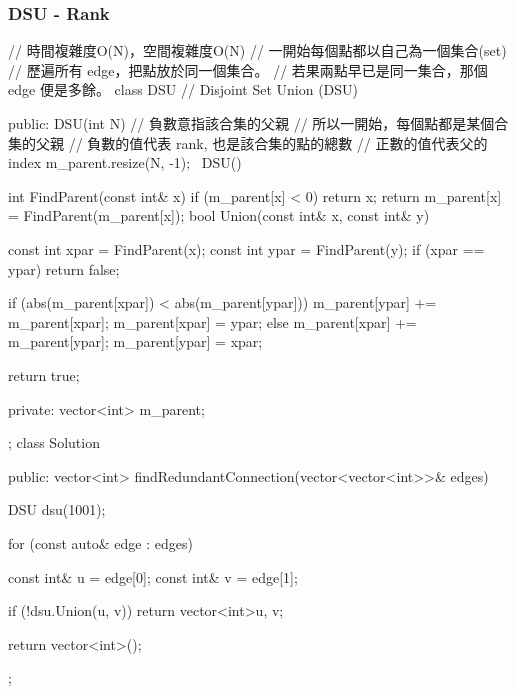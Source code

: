 \subsubsection{DSU - Rank}
\begin{Code}
// 時間複雜度O(N)，空間複雜度O(N)
// 一開始每個點都以自己為一個集合(set)
// 歷遍所有 edge，把點放於同一個集合。
// 若果兩點早已是同一集合，那個 edge 便是多餘。
class DSU // Disjoint Set Union (DSU)
{
public:
    DSU(int N)
    {
        // 負數意指該合集的父親
        // 所以一開始，每個點都是某個合集的父親
        // 負數的值代表 rank, 也是該合集的點的總數
        // 正數的值代表父的 index
        m_parent.resize(N, -1);
    }
    ~DSU() {}

    int FindParent(const int& x)
    {
        if (m_parent[x] < 0)
            return x;
        return m_parent[x] = FindParent(m_parent[x]);
    }
    bool Union(const int& x, const int& y)
    {
        const int xpar = FindParent(x);
        const int ypar = FindParent(y);
        if (xpar == ypar) return false;

        if (abs(m_parent[xpar]) < abs(m_parent[ypar]))
        {
            m_parent[ypar] += m_parent[xpar];
            m_parent[xpar] = ypar;
        }
        else
        {
            m_parent[xpar] += m_parent[ypar];
            m_parent[ypar] = xpar;
        }

        return true;
    }
private:
    vector<int> m_parent;
};
class Solution {
public:
    vector<int> findRedundantConnection(vector<vector<int>>& edges) {
        DSU dsu(1001);

        for (const auto& edge : edges)
        {
            const int& u = edge[0];
            const int& v = edge[1];

            if (!dsu.Union(u, v))
                return vector<int>{u, v};
        }

        return vector<int>();
    }
};
\end{Code}
